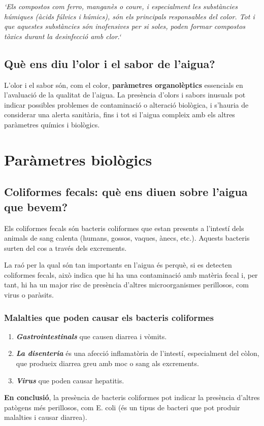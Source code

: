 \textit{`Els compostos com ferro, manganès o coure, i especialment les substàncies húmiques (àcids fúlvics i húmics), són els principals responsables del color. Tot i que aquestes substàncies són inofensives per si soles, poden formar compostos tòxics durant la desinfecció amb clor.`}~\cite{HA}

\subsection{Què ens diu l’olor i el sabor de l’aigua?} \label{subsec:olorisabor}
L’olor i el sabor són, com el color, \textbf{paràmetres organolèptics} essencials en l’avaluació de la qualitat de l’aigua. La presència d’olors i sabors inusuals pot indicar possibles problemes de contaminació o alteració biològica, i s’hauria de considerar una alerta sanitària, fins i tot si l’aigua compleix amb els altres paràmetres químics i biològics.

\section{Paràmetres biològics} \label{sec:pb}
\subsection{Coliformes fecals: què ens diuen sobre l’aigua que bevem?} \label{subsec:coliformes}
Els coliformes fecals són bacteris coliformes que estan presents a l’intestí dels animals de sang calenta (humans, gossos, vaques, ànecs, etc.). Aquests bacteris surten del cos a través dels excrements.

La raó per la qual són tan importants en l’aigua és perquè, si es detecten coliformes fecals, això indica que hi ha una contaminació amb matèria fecal i, per tant, hi ha un major risc de presència d’altres microorganismes perillosos, com virus o paràsits.
\subsubsection{Malalties que poden causar els bacteris coliformes}
\begin{enumerate}
 \item \textit{\textbf{Gastrointestinals}} que causen diarrea i vòmits.
 \item \textit{\textbf{La disenteria}} és una afecció inflamatòria de l’intestí, especialment del còlon, que produeix diarrea greu amb moc o sang als excrements.
 \item \textit{\textbf{Virus}} que poden causar hepatitis.
\end{enumerate}
\textbf{En conclusió}, la presència de bacteris coliformes pot indicar la presència d'altres patògens més perillosos, com E. coli (és un tipus de bacteri que pot produir malalties i causar diarrea).
